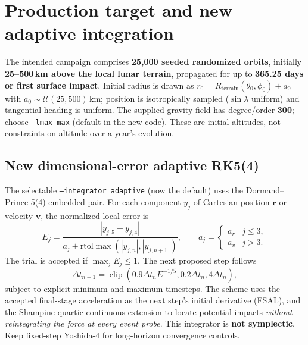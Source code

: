 \documentclass[11pt,a4paper]{article}
\newcommand{\opt}[1]{\texttt{#1}}
\begin{document}
\section{Production target and new adaptive integration}\label{sec:adaptive2026}
\begin{note}[title={Correct production altitude and duration}]
The intended campaign comprises \textbf{25,000 seeded randomized orbits}, initially
\textbf{25--500\,km above the local lunar terrain}, propagated for up to
\textbf{365.25 days or first surface impact}. Initial radius is drawn as
$r_0=R_{\mathrm{terrain}}(\theta_0,\phi_0)+a_0$ with
$a_0\sim\mathcal U(25,500)\,\mathrm{km}$; position is isotropically sampled
($\sin\lambda$ uniform) and tangential heading is uniform.
The supplied gravity field has degree/order \textbf{300}; choose
\opt{--lmax max} (default in the new code). These are initial altitudes,
not constraints on altitude over a year's evolution.
\end{note}
\subsection{New dimensional-error adaptive RK5(4)}
The selectable \opt{--integrator adaptive} (now the default) uses the
Dormand--Prince 5(4) embedded pair. For each component $y_j$ of Cartesian
position $\mathbf r$ or velocity $\mathbf v$, the normalized local error is
\begin{equation}
  E_j=\frac{|y_{j,5}-y_{j,4}|}{a_j+\mathrm{rtol}\max(|y_{j,n}|,|y_{j,n+1}|)},\qquad
  a_j=\begin{cases}a_r & j\le3,\\ a_v & j>3.\end{cases}
\end{equation}
The trial is accepted if $\max_j E_j\le1$. The next proposed step follows
\begin{equation}
\Delta t_{n+1}=\operatorname{clip}\left(0.9\Delta t_n E^{-1/5},
0.2\Delta t_n,4\Delta t_n\right),
\end{equation}
subject to explicit minimum and maximum timesteps. The scheme uses the
accepted final-stage acceleration as the next step's initial derivative
(FSAL), and the Shampine quartic continuous extension to locate potential
impacts \emph{without reintegrating the force at every event probe}.
This integrator is \textbf{not symplectic}. Keep fixed-step Yoshida-4 for
long-horizon convergence controls.
\end{document}
